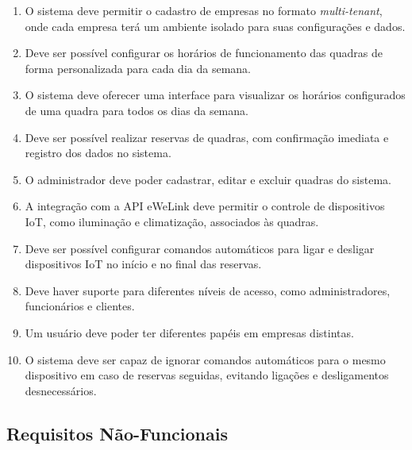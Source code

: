 \begin{enumerate}
     \item O sistema deve permitir o cadastro de empresas no formato \textit{multi-tenant}, onde cada empresa terá um ambiente isolado para suas configurações e dados.
     \item Deve ser possível configurar os horários de funcionamento das quadras de forma personalizada para cada dia da semana.
     \item O sistema deve oferecer uma interface para visualizar os horários configurados de uma quadra para todos os dias da semana.
     \item Deve ser possível realizar reservas de quadras, com confirmação imediata e registro dos dados no sistema.
     \item O administrador deve poder cadastrar, editar e excluir quadras do sistema.
     \item A integração com a API eWeLink deve permitir o controle de dispositivos IoT, como iluminação e climatização, associados às quadras.
     \item Deve ser possível configurar comandos automáticos para ligar e desligar dispositivos IoT no início e no final das reservas.
     \item Deve haver suporte para diferentes níveis de acesso, como administradores, funcionários e clientes.
     \item Um usuário deve poder ter diferentes papéis em empresas distintas.
     \item O sistema deve ser capaz de ignorar comandos automáticos para o mesmo dispositivo em caso de reservas seguidas, evitando ligações e desligamentos desnecessários.
\end{enumerate}

\subsection{Requisitos Não-Funcionais}\label{subsec:requisitos_nao_funcionais}

